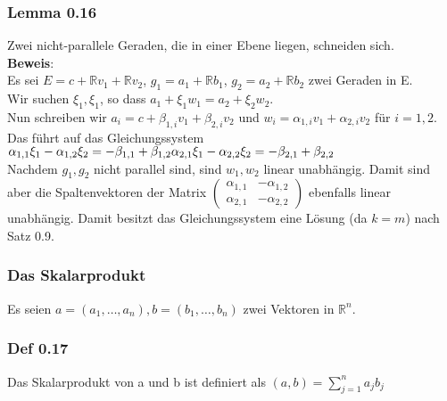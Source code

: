 \documentclass{scrartcl}
\newcommand{\R}{\mathbb{R}}
\newcommand{\mRn}{\(\mathbb{R}^n\)}
\newcommand{\al}{\alpha}
\begin{document}
\subsubsection{Lemma 0.16}
Zwei nicht-parallele Geraden, die in einer Ebene liegen, schneiden sich.\\
\textbf{Beweis}:\\
Es sei \(E = c + \R v_1 + \R v_2\), \(g_1 = a_1 + \R b_1\), \(g_2 = a_2 + \R b_2\) zwei Geraden in E.\\
Wir suchen \(\xi_1, \xi_1\), so dass \(a_1 + \xi_1 w_1 = a_2 + \xi_2 w_2\).\\
Nun schreiben wir \(a_i = c + \beta_{1,i} v_1 + \beta_{2,i} v_2\) und \(w_i = \al_{1,i} v_1 + \al_{2,i} v_2\) f\"ur \(i =1,2\).\\
Das f\"uhrt auf das Gleichungssystem\\
\(
\al_{1,1} \xi_1 - \al_{1,2} \xi_2 = - \beta_{1,1} + \beta_{1,2}\\
\al_{2,1} \xi_1 - \al_{2,2} \xi_2 = - \beta_{2,1} + \beta_{2,2}\\
\)\\
Nachdem \(g_1, g_2\) nicht parallel sind, sind \(w_1, w_2\) linear unabh\"angig. Damit sind aber die Spaltenvektoren der Matrix \(
\begin{pmatrix}
\al_{1,1} & -\al_{1,2}\\
\al_{2,1} & -\al_{2,2}
\end{pmatrix}
\) ebenfalls linear unabh\"angig. Damit besitzt das Gleichungssystem eine L\"osung (da \(k = m\)) nach Satz 0.9.

\subsubsection{Das Skalarprodukt}
Es seien \(a = (a_1, \dots, a_n), b = (b_1, \dots, b_n)\) zwei Vektoren in \mRn.\\

\subsubsection{Def 0.17}
Das Skalarprodukt von a und b ist definiert als \((a, b) = \sum_{j=1}^n a_j b_j\)
\end{document}
